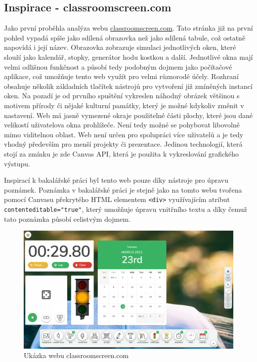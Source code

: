 \subsection{Inspirace - classroomscreen.com}
\label{sec:2.2}
Jako první proběhla analýza webu \underline{classroomscreen.com}.
Tato stránka již na první pohled vypadá spíše jako sdílená obrazovka než jako sdílená tabule, což ostatně napovídá i její název.
Obrazovka zobrazuje simulaci jednotlivých oken, které slouží jako kalendář, stopky, generátor hodu kostkou a další.
Jednotlivé okna mají velmi odlišnou funkčnost a působí tedy podobným dojmem jako počítačové aplikace, což umožňuje tento web využít pro velmi různorodé účely.
Rozhraní obsahuje několik základních tlačítek nástrojů pro vytvoření již zmíněných instancí oken.
Na pozadí je od prvního spuštění vykreslen náhodný obrázek většinou s motivem přírody či nějaké kulturní památky, který je možné kdykoliv změnit v nastavení.
Web má jasně vymezené okraje použitelné části plochy, které jsou dané velikostí uživatelova okna prohlížeče.
Není tedy možné se pohybovat libovolně mimo viditelnou oblast.
Web není určen pro spolupráci více uživatelů a je tedy vhodný především pro menší projekty či prezentace.
Jedinou technologií, která stojí za zmínku je zde Canvas API, která je použita k vykreslování grafického výstupu.
\begin{sloppypar*}
Inspirací k bakalářské práci byl tento web pouze díky nástroje pro úpravu poznámek.
Poznámka v bakalářské práci je stejně jako na tomto webu tvořena pomocí Canvasu překrytého HTML elementem \texttt{<div>} využívajícím atribut \texttt{contenteditable="true"}, který umožňuje úpravu vnitřního textu a díky čemuž tato poznámka působí celistvým dojmem.
\end{sloppypar*}
\begin{figure}[h!]
	\centering
	\includegraphics[width=1\textwidth]{Figures/classroomscreen.png}
	\caption{Ukázka webu classroomscreen.com}
	\label{fig:classroomscreen}
\end{figure}



